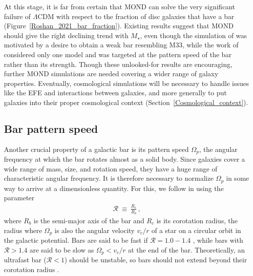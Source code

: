 \documentclass[fleqn,usenatbib,useAMS]{mnras} %
\begin{document}
At this stage, it is far from certain that MOND can solve the very significant failure of $\Lambda$CDM with respect to the fraction of disc galaxies that have a bar (Figure~\ref{Roshan_2021_bar_fraction}). Existing results suggest that MOND should give the right declining trend with $M_{\star}$, even though the simulation of \citet{Banik_2020_M33} was motivated by a desire to obtain a weak bar resembling M33, while the work of \citet{Roshan_2021_disc_stability} considered only one model and was targeted at the pattern speed of the bar rather than its strength. Though these unlooked-for results are encouraging, further MOND simulations are needed covering a wider range of galaxy properties. Eventually, cosmological simulations will be necessary to handle issues like the EFE and interactions between galaxies, and more generally to put galaxies into their proper cosmological context (Section~\ref{Cosmological_context}).



\subsection{Bar pattern speed}
\label{Bar_pattern_speed}

Another crucial property of a galactic bar is its pattern speed $\Omega_p$, the angular frequency at which the bar rotates almost as a solid body. Since galaxies cover a wide range of mass, size, and rotation speed, they have a huge range of characteristic angular frequency. It is therefore necessary to normalize $\Omega_p$ in some way to arrive at a dimensionless quantity. For this, we follow \citet{Elmegreen_1996} in using the parameter
\begin{eqnarray}
	\mathcal{R} ~\equiv~ \frac{R_c}{R_b} \, ,
	\label{R_def}
\end{eqnarray}
where $R_b$ is the semi-major axis of the bar and $R_c$ is its corotation radius, the radius where $\Omega_p$ is also the angular velocity $v_c/r$ of a star on a circular orbit in the galactic potential. Bars are said to be fast if $\mathcal{R} = 1.0-1.4$ \citep{Galactic_Dynamics}, while bars with $\mathcal{R} > 1.4$ are said to be slow as $\Omega_p < v_c/r$ at the end of the bar. Theoretically, an ultrafast bar ($\mathcal{R} < 1$) should be unstable, so bars should not extend beyond their corotation radius \citep{Contopoulos_1980, Contopoulos_1981, Contopoulos_1989}.
\end{document}
